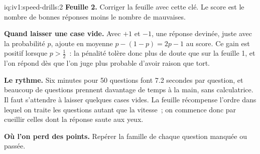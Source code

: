 \begin{solution}{iq:iv1:speed-drills:2}
\textbf{Feuille 2.} Corriger la feuille avec cette clé. Le score est le nombre de bonnes réponses moins le nombre de mauvaises.
\par\nopagebreak


\textbf{Quand laisser une case vide.} Avec $+1$ et $-1$, une réponse devinée, juste avec la probabilité $p$, ajoute en moyenne $p - (1 - p) = 2p - 1$ au score. Ce gain est positif lorsque $p > \tfrac12$~: la pénalité tolère donc plus de doute que sur la feuille 1, et l'on répond dès que l'on juge plus probable d'avoir raison que tort.

\textbf{Le rythme.} Six minutes pour 50 questions font 7.2 secondes par question, et beaucoup de questions prennent davantage de temps à la main, sans calculatrice. Il faut s'attendre à laisser quelques cases vides. La feuille récompense l'ordre dans lequel on traite les questions autant que la vitesse~; on commence donc par cueillir celles dont la réponse saute aux yeux.

\textbf{Où l'on perd des points.} Repérer la famille de chaque question manquée ou passée.


\end{solution}

